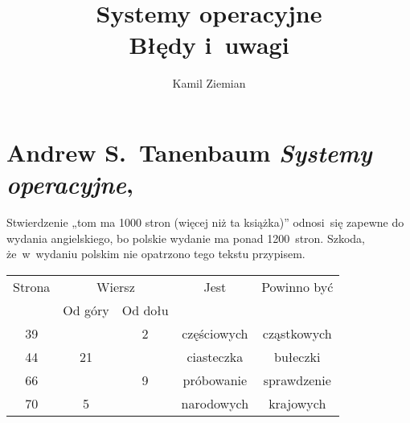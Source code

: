 \documentclass[a4paper,11pt]{article}
\title{Systemy operacyjne \\
  {\Large Błędy i~uwagi}}
\author{Kamil Ziemian}
\numberwithin{equation}{section}
\begin{document}





\maketitle





\section{Andrew S.~Tanenbaum \textit{Systemy operacyjne},
  \parencite{Tanenbaum-Systemy-operacyjne-Wydanie-III-Pub-2013}}

\label{sec:Tanenbaum-Systemy-operacyjne}




\noindent
{} Stwierdzenie „tom ma 1000 stron (więcej niż ta
książka)” odnosi~się zapewne do wydania angielskiego, bo polskie wydanie ma
ponad 1200~stron. Szkoda, że~w~wydaniu polskim nie opatrzono tego tekstu
przypisem.





\newpage



\begin{center}

  \begin{tabular}{|c|c|c|c|c|}
    \hline
    Strona & \multicolumn{2}{c|}{Wiersz} & Jest
    & Powinno być \\ \cline{2-3}
           & Od góry & Od dołu & & \\
    \hline
    39 & & \hphantom{0}2 & częściowych & cząstkowych \\
    44 & 21 & & ciasteczka & bułeczki \\
    66 & & \hphantom{0}9 & próbowanie & sprawdzenie \\
    70 & \hphantom{0}5 & & narodowych & krajowych \\
    \hline
  \end{tabular}

\end{center}
\end{document}
